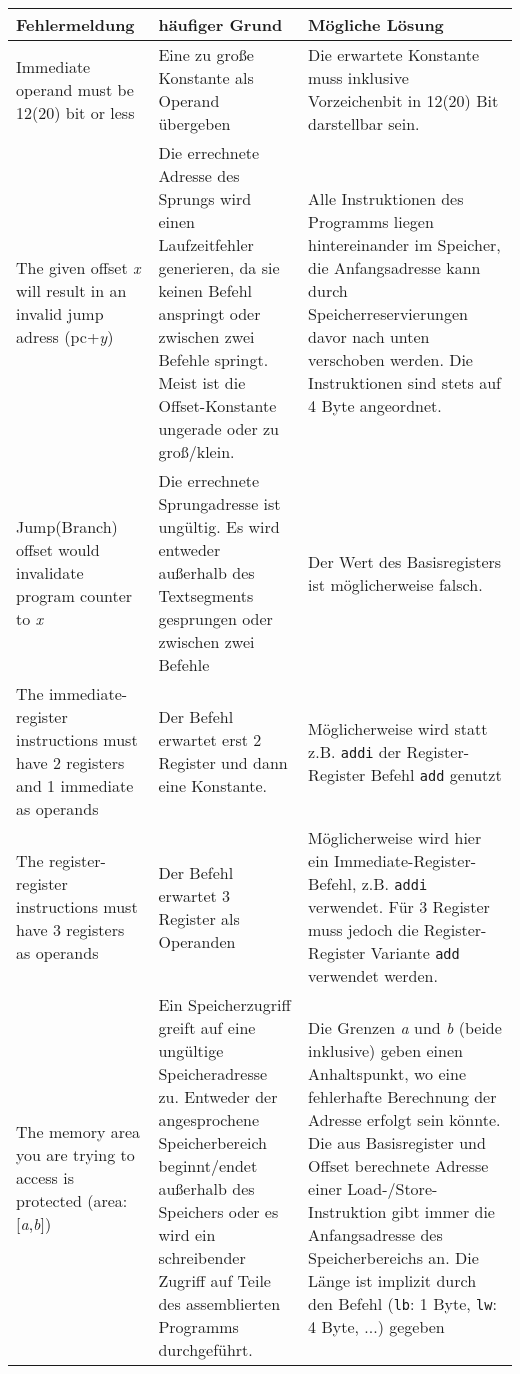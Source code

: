 \begin{tabular}{|p{5cm}|p{5cm}|p{5cm}|}
	\hline
	Fehlermeldung & häufiger Grund & Mögliche Lösung\\
	\hline
	Immediate operand must be 12(20) bit or less & Eine zu große Konstante als Operand übergeben & Die erwartete Konstante muss inklusive Vorzeichenbit in 12(20) Bit darstellbar sein.\\
	\hline
	The given offset \textit{x} will result in an invalid jump adress (pc+\textit{y}) &
	Die errechnete Adresse des Sprungs wird einen Laufzeitfehler generieren, da sie keinen Befehl anspringt oder zwischen zwei Befehle springt. Meist ist die Offset-Konstante ungerade oder zu groß/klein. & Alle Instruktionen des Programms liegen hintereinander im Speicher, die Anfangsadresse kann durch Speicherreservierungen davor nach unten verschoben werden. Die Instruktionen sind stets auf 4 Byte angeordnet.\\
	\hline
	Jump(Branch) offset would invalidate program counter to \textit{x} & Die errechnete Sprungadresse ist ungültig. Es wird entweder außerhalb des Textsegments gesprungen oder zwischen zwei Befehle &
	Der Wert des Basisregisters ist möglicherweise falsch.\\
	\hline
	The immediate-register instructions must have 2 registers and 1 immediate as operands & Der Befehl erwartet erst 2 Register und dann eine Konstante. & Möglicherweise wird statt z.B. \texttt{addi} der Register-Register Befehl \texttt{add} genutzt\\
	\hline
	The register-register instructions must have 3 registers as operands & Der Befehl erwartet 3 Register als Operanden& Möglicherweise wird hier ein Immediate-Register-Befehl, z.B. \texttt{addi} verwendet. Für 3 Register muss jedoch die Register-Register Variante \texttt{add} verwendet werden.\\
	\hline
	The memory area you are trying to access is protected (area: [\textit{a},\textit{b}]) & Ein Speicherzugriff greift auf eine ungültige Speicheradresse zu. Entweder der angesprochene Speicherbereich beginnt/endet außerhalb des Speichers oder es wird ein schreibender Zugriff auf Teile des assemblierten Programms durchgeführt. & Die Grenzen \textit{a} und \textit{b} (beide inklusive) geben einen Anhaltspunkt, wo eine fehlerhafte Berechnung der Adresse erfolgt sein könnte. Die aus Basisregister und Offset berechnete Adresse einer Load-/Store-Instruktion gibt immer die Anfangsadresse des Speicherbereichs an. Die Länge ist implizit durch den Befehl (\texttt{lb}: 1 Byte, \texttt{lw}: 4 Byte, ...) gegeben\\
	\hline
\end{tabular}

